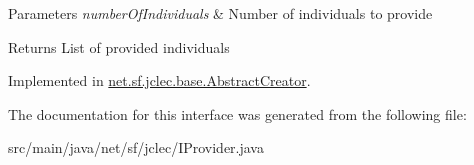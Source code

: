 \begin{DoxyParams}{Parameters}
{\em number\-Of\-Individuals} & Number of individuals to provide\\
\hline
\end{DoxyParams}
\begin{DoxyReturn}{Returns}
List of provided individuals 
\end{DoxyReturn}


Implemented in \hyperlink{classnet_1_1sf_1_1jclec_1_1base_1_1_abstract_creator_a96dcee22b134108056b56515c6043d9b}{net.\-sf.\-jclec.\-base.\-Abstract\-Creator}.



The documentation for this interface was generated from the following file\-:\begin{DoxyCompactItemize}
\item 
src/main/java/net/sf/jclec/I\-Provider.\-java\end{DoxyCompactItemize}
